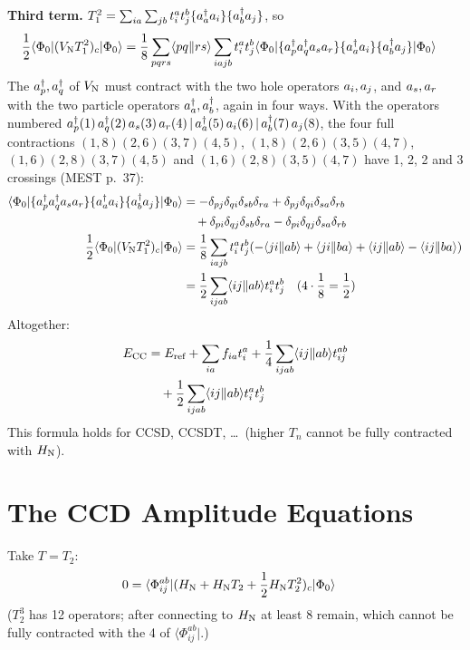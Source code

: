 \textbf{Third term.} $T_1^2 = \sum_{ia} \sum_{jb} t_i^a t_j^b \{a^{\dagger}_{a} a_{i}\}\{a^{\dagger}_{b} a_{j}\}$, so
\begin{align*}
\frac{1}{2} \langle \Phi_0|(V_{\mathrm{N}}  T_1^2)_c|\Phi_0\rangle &= \frac{1}{8} \sum_{pqrs} \langle pq\Vert rs\rangle \sum_{iajb} t_i^a t_j^b \langle \Phi_0|\{a^{\dagger}_{p} a^{\dagger}_{q} a_{s} a_{r}\} \{a^{\dagger}_{a} a_{i}\} \{a^{\dagger}_{b} a_{j}\}|\Phi_0\rangle
\end{align*}
The $a^{\dagger}_{p}, a^{\dagger}_{q}$ of $V_{\mathrm{N}}$ must contract with the two hole operators $a_{i}, a_{j}$, and $a_{s}, a_{r}$ with the two particle operators $a^{\dagger}_{a}, a^{\dagger}_{b}$, again in four ways. With the operators numbered $a^{\dagger}_{p} (1)\, a^{\dagger}_{q} (2)\, a_{s} (3)\, a_{r} (4)\allowbreak\, |\, a^{\dagger}_{a} (5)\, a_{i} (6)\allowbreak\, |\, a^{\dagger}_{b} (7)\, a_{j} (8)$, the four full contractions $(1,8)(2,6)(3,7)(4,5)$, $(1,8)(2,6)(3,5)(4,7)$, $(1,6)(2,8)(3,7)(4,5)$ and $(1,6)(2,8)(3,5)(4,7)$ have 1, 2, 2 and 3 crossings (MEST p.~37):
\begin{align*}
\langle \Phi_0|\{a^{\dagger}_{p} a^{\dagger}_{q} a_{s} a_{r}\} \{a^{\dagger}_{a} a_{i}\} \{a^{\dagger}_{b} a_{j}\}|\Phi_0\rangle &= -\delta_{pj} \delta_{qi} \delta_{sb} \delta_{ra} + \delta_{pj} \delta_{qi} \delta_{sa} \delta_{rb} \\
&\quad + \delta_{pi} \delta_{qj} \delta_{sb} \delta_{ra} - \delta_{pi} \delta_{qj} \delta_{sa} \delta_{rb} \\
\frac{1}{2} \langle \Phi_0|(V_{\mathrm{N}}  T_1^2)_c|\Phi_0\rangle &= \frac{1}{8} \sum_{iajb} t_i^a t_j^b (-\langle ji\Vert ab\rangle + \langle ji\Vert ba\rangle + \langle ij\Vert ab\rangle - \langle ij\Vert ba\rangle) \\
&= \frac{1}{2} \sum_{ijab} \langle ij\Vert ab\rangle t_i^a t_j^b \quad\text{($4 \cdot \frac{1}{8} = \frac{1}{2}$)}
\end{align*}
Altogether:
\begin{align}\label{eq:ecc}
E_{\text{CC}} &= E_{\text{ref}} + \sum_{ia} f_{ia} t_i^a + \frac{1}{4} \sum_{ijab} \langle ij\Vert ab\rangle t_{ij}^{ab} \\
&\quad + \frac{1}{2} \sum_{ijab} \langle ij\Vert ab\rangle t_i^a t_j^b \notag
\end{align}
This formula holds for CCSD, CCSDT, \ldots\ (higher $T_n$ cannot be fully contracted with $H_{\mathrm{N}}$).

\section{The CCD Amplitude Equations}

Take $T = T_2$:
\begin{align*}
0 &= \langle \Phi_{ij}^{ab}|(H_{\mathrm{N}}  + H_{\mathrm{N}}  T_2 + \frac{1}{2} H_{\mathrm{N}}  T_2^2)_c|\Phi_0\rangle
\end{align*}
($T_2^3$ has 12 operators; after connecting to $H_{\mathrm{N}}$ at least 8 remain, which cannot be fully contracted with the 4 of $\langle \Phi_{ij}^{ab}|$.)

